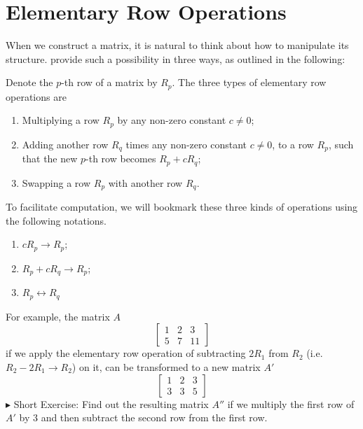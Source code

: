\section{Elementary Row Operations}
When we construct a matrix, it is natural to think about how to manipulate its structure.  provide such a possibility in three ways, as outlined in the following:
\begin{defn}
\label{defn:elerowop}
Denote the $p$-th row of a matrix by $R_{p}$. The three types of elementary row operations are
\begin{enumerate}
\item Multiplying a row $R_{p}$ by any non-zero constant $c \neq 0$;
\item Adding another row $R_{q}$ times any non-zero constant $c \neq 0$, to a row $R_{p}$, such that the new $p$-th row becomes $R_{p} + cR_{q}$;
\item Swapping a row $R_{p}$ with another row $R_{q}$.
\end{enumerate}
To facilitate computation, we will bookmark these three kinds of operations using the following notations.
\begin{enumerate}
\item $cR_{p} \rightarrow R_{p}$;
\item $R_{p} + cR_{q} \rightarrow R_{p}$;
\item $R_{p} \leftrightarrow R_{q}$
\end{enumerate}
\end{defn}
For example, the matrix $A$
\begin{equation*}
\begin{bmatrix}
1 & 2 & 3 \\
5 & 7 & 11
\end{bmatrix}
\end{equation*}
if we apply the elementary row operation of subtracting $2R_1$ from $R_2$ (i.e.\ $R_2 - 2R_1 \to R_2$) on it, can be transformed to a new matrix $A'$
\begin{equation*}
\begin{bmatrix}
1 & 2 & 3 \\
3 & 3 & 5
\end{bmatrix}
\end{equation*}$\blacktriangleright$ Short Exercise: Find out the resulting matrix $A''$ if we multiply the first row of $A'$ by $3$ and then subtract the second row from the first row.\footnotemark\par
